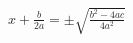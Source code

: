 \documentclass[preview]{standalone}
\begin{document}
\begin{align*}
x + \frac{b}{2a} = \pm \sqrt{\frac{b^2 - 4ac}{4a^2}}
\end{align*}
\end{document}
